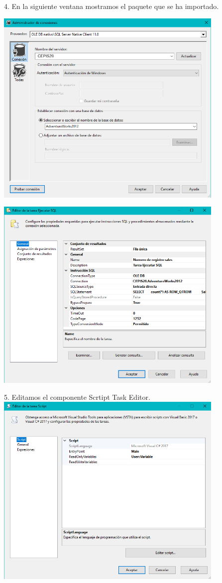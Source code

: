 4. En la siguiente ventana mostramos el paquete que se ha importado.\\
	\begin{center}
	\includegraphics[width=11cm]{./Imagenes/img19}
	\end{center}	
	\begin{center}
	\includegraphics[width=11cm]{./Imagenes/img20}
	\end{center}	
	\begin{center}

5. Editamos el componente Scrtipt Task Editor.\\
	\includegraphics[width=11cm]{./Imagenes/img21}
	\end{center}	
